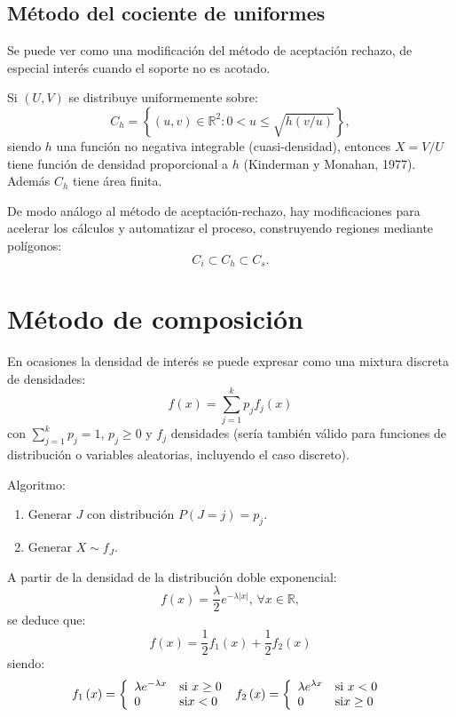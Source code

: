 \documentclass[
]{book}
\theoremstyle{break}
\theoremstyle{definition}
\theoremstyle{definition}
\theoremstyle{definition}
\theoremstyle{remark}
\let\BeginKnitrBlock\begin \let\EndKnitrBlock\end
\begin{document}
\hypertarget{muxe9todo-del-cociente-de-uniformes}{%
\subsection{Método del cociente de uniformes}\label{muxe9todo-del-cociente-de-uniformes}}

Se puede ver como una modificación del método de aceptación rechazo,
de especial interés cuando el soporte no es acotado.

Si \((U,V)\) se distribuye uniformemente sobre:
\[C_{h} = \left\{ \left( u,v\right) \in \mathbb{R}^{2} : 
0<u\leq \sqrt{h(v/u)} \right\},\]
siendo \(h\) una función no negativa integrable
(cuasi-densidad), entonces \(X=V/U\) tiene función de densidad
proporcional a \(h\) (Kinderman y Monahan, 1977).
Además \(C_{h}\) tiene área finita.

De modo análogo al método de aceptación-rechazo, hay modificaciones
para acelerar los cálculos y automatizar el proceso, construyendo
regiones mediante polígonos:\[C_{i}\subset C_{h}\subset C_{s}.\]

\hypertarget{muxe9todo-de-composiciuxf3n}{%
\section{Método de composición}\label{muxe9todo-de-composiciuxf3n}}

En ocasiones la densidad de interés se puede expresar como una
mixtura discreta de densidades:
\[f(x)=\sum_{j=1}^{k}p_{j}f_{j}(x)\]
con \(\sum_{j=1}^{k}p_j=1\), \(p_j\geq 0\) y \(f_j\) densidades
(sería también válido para funciones de distribución o variables aleatorias,
incluyendo el caso discreto).

Algoritmo:

\begin{enumerate}
\def\labelenumi{\arabic{enumi}.}
\item
  Generar \(J\) con distribución \(P\left( J=j \right) = p_j\).
\item
  Generar \(X\sim f_J\).
\end{enumerate}

\BeginKnitrBlock{example}[Distribución doble exponencial]
\protect\hypertarget{exm:dexp-mix}{}{\label{exm:dexp-mix} \iffalse (Distribución doble exponencial) \fi{} }
\EndKnitrBlock{example}

A partir de la densidad de la distribución doble exponencial:
\[f\left( x\right) =\frac{\lambda }{2}e^{-\lambda \left\vert x\right\vert }%
\text{, }\forall x\in \mathbb{R},\]
se deduce que:
\[f\left( x\right) =\frac{1}{2}f_{1}\left( x\right) +\frac{1}{2}f_{2}\left(
x\right)\]
siendo:
\[f_{1}\left( x\right) = \left\{ 
\begin{array}{ll}
\lambda e^{-\lambda x} & \text{si } x\geq 0 \\ 
0 & \text{si} x<0
\end{array}
\ \right. \\
f_{2}\left( x\right) = \left\{ 
\begin{array}{ll}
\lambda e^{\lambda x} & \text{si } x<0 \\ 
0 & \text{si} x\geq 0
\end{array}
\ \right.\]
\end{document}
